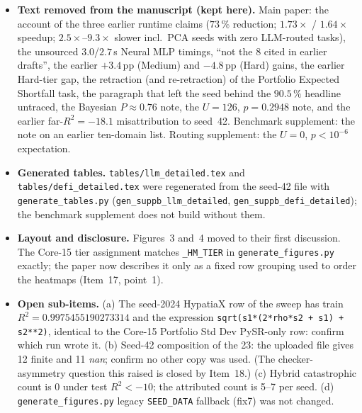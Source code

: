 \documentclass[11pt]{article}
\newcommand{\Rsq}{R^{2}}
\begin{document}
\begin{itemize}
do not reproduce from the raw files under any natural convention (the nearest, clipping at 0 and rounding to four decimals, gives $62$, $0.031$). PySR-only is
therefore higher under the first convention but not significantly so at the 5\,\% level (one-sided $p=0.048$ for PySR-only higher).
\item \textbf{Text removed from the manuscript (kept here).} Main paper: the account of the three earlier runtime claims ($73\,\%$ reduction; $1.73\times$ / $1.64\times$
speedup; $2.5\times$--$9.3\times$ slower incl.\ PCA seeds with zero LLM-routed tasks), the unsourced $3.0$/$2.7$\,s Neural MLP timings, ``not the 8 cited in earlier drafts'',
the earlier $+3.4$\,pp (Medium) and $-4.8$\,pp (Hard) gains, the earlier Hard-tier gap, the retraction (and re-retraction) of the Portfolio Expected Shortfall task, the paragraph
that left the seed behind the $90.5\,\%$ headline untraced, the Bayesian $P\approx0.76$ note, the $U=126$, $p=0.2948$ note, and the earlier far-$\Rsq=-18.1$ misattribution to seed~42.
Benchmark supplement: the note on an earlier ten-domain list. Routing supplement: the $U=0$, $p<10^{-6}$ expectation.
\item \textbf{Generated tables.} \texttt{tables/llm\_detailed.tex} and \texttt{tables/defi\_detailed.tex} were regenerated from the seed-42 file with
\texttt{generate\_tables.py} (\texttt{gen\_suppb\_llm\_detailed}, \texttt{gen\_suppb\_defi\_detailed}); the benchmark supplement does not build without them.
\item \textbf{Layout and disclosure.} Figures~3 and~4 moved to their first discussion. The Core-15 tier assignment matches \texttt{\_HM\_TIER} in
\texttt{generate\_figures.py} exactly; the paper now describes it only as a fixed row grouping used to order the heatmaps (Item~17, point~1).
\item \textbf{Open sub-items.} (a) The seed-2024 HypatiaX row of the sweep has train $\Rsq=0.9975455190273314$ and the expression
\texttt{sqrt(s1*(2*rho*s2 + s1) + s2**2)}, identical to the Core-15 Portfolio Std Dev PySR-only row: confirm which run wrote it.
(b) Seed-42 composition of the 23: the uploaded file gives 12 finite and 11 \textit{nan}; confirm no other copy was used. (The checker-asymmetry question this raised is closed by Item~18.)
(c) Hybrid catastrophic count is 0 under test $\Rsq<-10$; the attributed count is 5--7 per seed. (d) \texttt{generate\_figures.py} legacy
\texttt{SEED\_DATA} fallback (fix7) was not changed.
\end{itemize}
\end{document}
